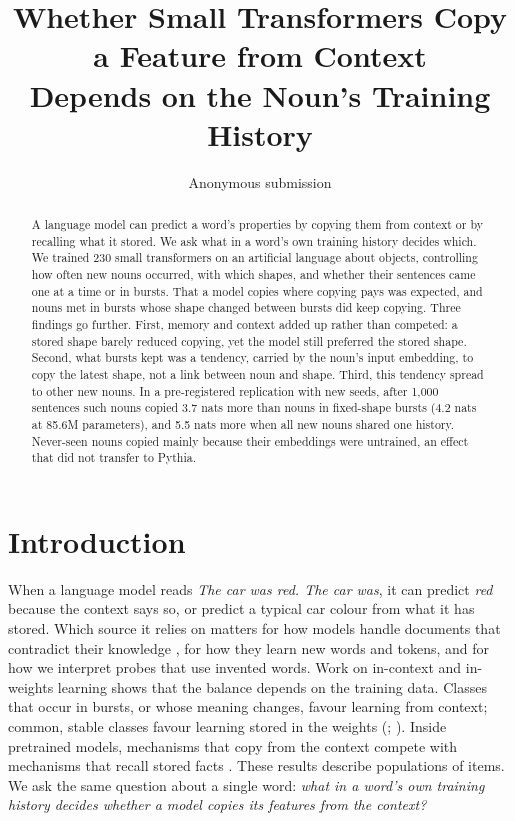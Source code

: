 \documentclass[11pt]{article}
\title{Whether Small Transformers Copy a Feature from Context\\Depends on the Noun's Training History}
\author{Anonymous submission}
\begin{document}
\maketitle

\begin{abstract}
A language model can predict a word's properties by copying them from context or by recalling what it stored. We ask what in a word's own training history decides which. We trained 230 small transformers on an artificial language about objects, controlling how often new nouns occurred, with which shapes, and whether their sentences came one at a time or in bursts. That a model copies where copying pays was expected, and nouns met in bursts whose shape changed between bursts did keep copying. Three findings go further. First, memory and context added up rather than competed: a stored shape barely reduced copying, yet the model still preferred the stored shape. Second, what bursts kept was a tendency, carried by the noun's input embedding, to copy the latest shape, not a link between noun and shape. Third, this tendency spread to other new nouns. In a pre-registered replication with new seeds, after 1,000 sentences such nouns copied 3.7 nats more than nouns in fixed-shape bursts (4.2 nats at 85.6M parameters), and 5.5 nats more when all new nouns shared one history. Never-seen nouns copied mainly because their embeddings were untrained, an effect that did not transfer to Pythia.
\end{abstract}

\section{Introduction}
When a language model reads \emph{The car was red. The car was}, it can predict \emph{red} because the context says so, or predict a typical car colour from what it has stored. Which source it relies on matters for how models handle documents that contradict their knowledge \citep{longpre2021,xie2024}, for how they learn new words and tokens, and for how we interpret probes that use invented words. Work on in-context and in-weights learning shows that the balance depends on the training data. Classes that occur in bursts, or whose meaning changes, favour learning from context; common, stable classes favour learning stored in the weights (\citealp{chan2022}; \citealp{chan2025}). Inside pretrained models, mechanisms that copy from the context compete with mechanisms that recall stored facts \citep{yu2023,jin2024,ortu2024}. These results describe populations of items. We ask the same question about a single word: \emph{what in a word's own training history decides whether a model copies its features from the context?}
\end{document}
